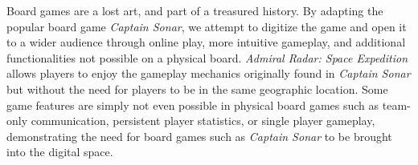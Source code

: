Board games are a lost art, and part of a treasured history. By adapting the popular board game \textit{Captain Sonar}, we attempt to digitize the game and open it to a wider audience through online play, more intuitive gameplay, and additional functionalities not possible on a physical board. \textit{Admiral Radar: Space Expedition} allows players to enjoy the gameplay mechanics originally found in \textit{Captain Sonar} but without the need for players to be in the same geographic location. Some game features are simply not even possible in physical board games such as team-only communication, persistent player statistics, or single player gameplay, demonstrating the need for board games such as \textit{Captain Sonar} to be brought into the digital space.

